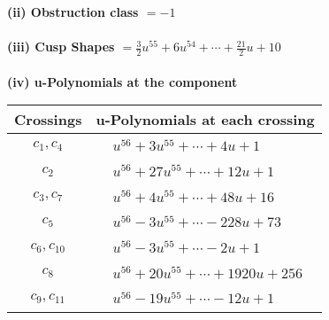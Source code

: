 \documentclass[1p]{elsarticle_modified}
\theoremstyle{definition}
\begin{document}
\flushleft \textbf{(ii) Obstruction class $= -1$}\\~\\
\flushleft \textbf{(iii) Cusp Shapes $= \frac{3}{2} u^{55}+6 u^{54}+\cdots+\frac{21}{2} u+10$}\\~\\
\newpage\renewcommand{\arraystretch}{1}
\flushleft \textbf{(iv) u-Polynomials at the component}\newline \\
\begin{tabular}{m{50pt}|m{274pt}}
Crossings & \hspace{64pt}u-Polynomials at each crossing \\
\hline $$\begin{aligned}c_{1},c_{4}\end{aligned}$$&$\begin{aligned}
&u^{56}+3 u^{55}+\cdots+4 u+1
\end{aligned}$\\
\hline $$\begin{aligned}c_{2}\end{aligned}$$&$\begin{aligned}
&u^{56}+27 u^{55}+\cdots+12 u+1
\end{aligned}$\\
\hline $$\begin{aligned}c_{3},c_{7}\end{aligned}$$&$\begin{aligned}
&u^{56}+4 u^{55}+\cdots+48 u+16
\end{aligned}$\\
\hline $$\begin{aligned}c_{5}\end{aligned}$$&$\begin{aligned}
&u^{56}-3 u^{55}+\cdots-228 u+73
\end{aligned}$\\
\hline $$\begin{aligned}c_{6},c_{10}\end{aligned}$$&$\begin{aligned}
&u^{56}-3 u^{55}+\cdots-2 u+1
\end{aligned}$\\
\hline $$\begin{aligned}c_{8}\end{aligned}$$&$\begin{aligned}
&u^{56}+20 u^{55}+\cdots+1920 u+256
\end{aligned}$\\
\hline $$\begin{aligned}c_{9},c_{11}\end{aligned}$$&$\begin{aligned}
&u^{56}-19 u^{55}+\cdots-12 u+1
\end{aligned}$\\
\hline
\end{tabular}\\~\\
\end{document}
